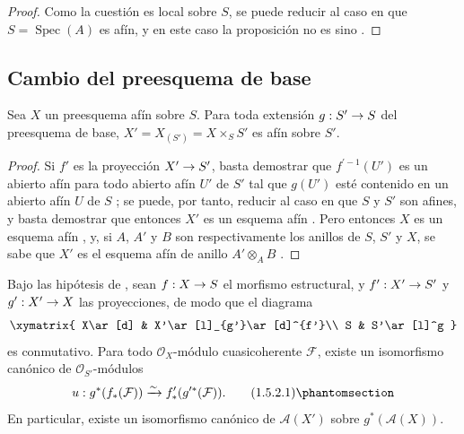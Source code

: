\documentclass[oneside,10pt]{amsart}
\makeatletter
\newcommand{\ega@arrow}[2]{\mathchoice{#1}{#2}{#2}{#2}}
\renewcommand{\to}{\ega@arrow{\longrightarrow}{\rightarrow}}
\let\EGAOriginalLabel\label
\renewcommand{\label}[1]{\phantomsection\EGAOriginalLabel{#1}}
\makeatother
\begin{document}
\begin{proof}
Como la cuestión es local sobre $S$, se puede reducir al caso en que $S=\operatorname{Spec}(A)$ es afín, y en este caso la proposición no es sino .
\end{proof}

\subsection{Cambio del preesquema de base}
\label{II.1.5-fr}

\begin{proposition}[1.5.1]
\label{II.1.5.1-fr}
Sea $X$ un preesquema afín sobre $S$.
Para toda extensión $g:S'\to S$ del preesquema de base, $X'=X_{(S')}=X\times_S S'$ es afín sobre $S'$.
\end{proposition}

\begin{proof}
Si $f'$ es la proyección $X'\to S'$, basta demostrar que $f^{\prime-1}(U')$ es un abierto afín para todo abierto afín $U'$ de $S'$ tal que $g(U')$ esté contenido en un abierto afín $U$ de $S$ ; se puede, por tanto, reducir al caso en que $S$ y $S'$ son afines, y basta demostrar que entonces $X'$ es un esquema afín .
Pero entonces $X$ es un esquema afín , y, si $A$, $A'$ y $B$ son respectivamente los anillos de $S$, $S'$ y $X$, se sabe que $X'$ es el esquema afín de anillo $A'\otimes_A B$ .
\end{proof}

\begin{corollary}[1.5.2]
\label{II.1.5.2-fr}
Bajo las hipótesis de , sean $f:X\to S$ el morfismo estructural, y $f':X'\to S'$ y $g':X'\to X$ las proyecciones, de modo que el diagrama
\[
  \xymatrix{
    X\ar[d] & X'\ar[l]_{g'}\ar[d]^{f'}\\
    S & S'\ar[l]^g
  }
\]
es conmutativo.
Para todo $\mathcal{O}_X$-módulo cuasicoherente $\mathcal{F}$, existe un isomorfismo canónico de $\mathcal{O}_{S'}$-módulos
\[
  u:g^*(f_*(\mathcal{F}))\xrightarrow{\sim}
  f'_*(g^{\prime*}(\mathcal{F})).
  \tag{1.5.2.1}\label{II.1.5.2.1-fr}
\]
En particular, existe un isomorfismo canónico de $\mathcal{A}(X')$ sobre $g^*(\mathcal{A}(X))$.
\end{corollary}
\end{document}
